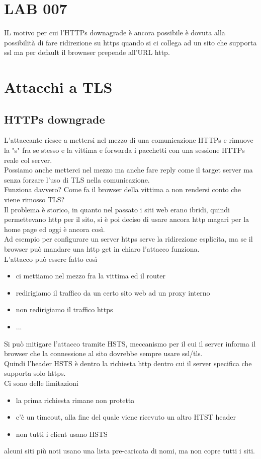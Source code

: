 \documentclass[12pt, oneside]{extbook} %
\begin{document}
\section*{LAB 007}
IL motivo per cui l'HTTPs downagrade è ancora possibile è dovuta alla possibilità di fare ridirezione su https quando si ci collega ad un sito che supporta ssl ma per default il brownser prepende all'URL http.

\section{Attacchi a TLS}
\subsection{HTTPs downgrade}
L'attaccante riesce a mettersi nel mezzo di una comunicazione HTTPs e rimuove la "s" fra se stesso e la vittima e forwarda i pacchetti con una sessione HTTPs reale col server.
\\Possiamo anche metterci nel mezzo ma anche fare reply come il target server ma senza forzare l'uso di TLS nella comunicazione.
\\Funziona davvero? Come fa il browser della vittima a non rendersi conto che viene rimosso TLS?
\\Il problema è storico, in quanto nel passato i siti web erano ibridi, quindi permettevano http per il sito, si è poi deciso di usare ancora http magari per la home page ed oggi è ancora così.
\\Ad esempio per configurare un server https serve la ridirezione esplicita, ma se il browser può mandare una http get in chiaro l'attacco funziona.
\\L'attacco può essere fatto così
\begin{itemize}
    \item ci mettiamo nel mezzo fra la vittima ed il router
    \item redirigiamo il traffico da un certo sito web ad un proxy interno
    \item non redirigiamo il traffico https
    \item ...
\end{itemize}
Si può mitigare l'attacco tramite HSTS, meccanismo per il cui il server informa il browser che la connessione al sito dovrebbe sempre usare ssl/tls.
\\Quindi l'header HSTS è dentro la richiesta http dentro cui il server specifica che supporta solo https.
\\Ci sono delle limitazioni
\begin{itemize}
    \item la prima richiesta rimane non protetta
    \item c'è un timeout, alla fine del quale viene ricevuto un altro HTST header
    \item non tutti i client usano HSTS
\end{itemize}
alcuni siti più noti usano una lista pre-caricata di nomi, ma non copre tutti i siti.
\end{document}
